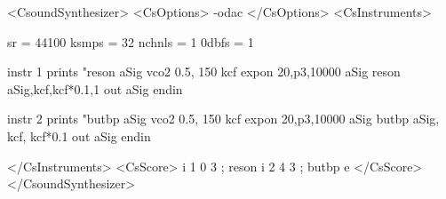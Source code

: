 <CsoundSynthesizer>
<CsOptions>
-odac
</CsOptions>
<CsInstruments>

sr = 44100
ksmps = 32
nchnls = 1
0dbfs = 1

  instr 1
        prints       "reson%
aSig    vco2         0.5, 150          
kcf     expon        20,p3,10000       
aSig    reson        aSig,kcf,kcf*0.1,1 
        out          aSig            
  endin

  instr 2
        prints       "butbp%
aSig    vco2         0.5, 150         
kcf     expon        20,p3,10000       
aSig    butbp        aSig, kcf, kcf*0.1 
        out          aSig            
  endin

</CsInstruments>
<CsScore>
i 1 0  3 ; reson 
i 2 4  3 ; butbp
e
</CsScore>
</CsoundSynthesizer>